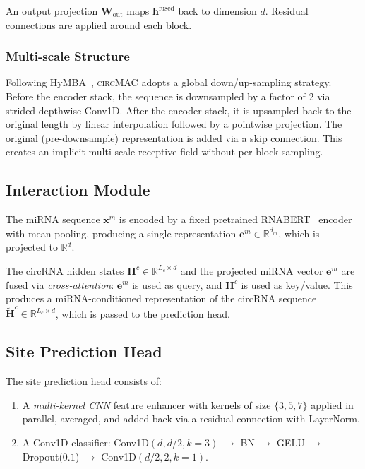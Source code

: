\documentclass[11pt]{article}
\newcommand{\model}{\textsc{circMAC}}
\begin{document}
\noindent
An output projection $\mathbf{W}_{\text{out}}$ maps
$\mathbf{h}^{\text{fused}}$ back to dimension $d$.
Residual connections are applied around each block.

\subsubsection{Multi-scale Structure}

Following HyMBA~\cite{hymba}, \model{} adopts a global down/up-sampling
strategy.
Before the encoder stack, the sequence is downsampled by a factor of 2
via strided depthwise Conv1D.
After the encoder stack, it is upsampled back to the original length by
linear interpolation followed by a pointwise projection.
The original (pre-downsample) representation is added via a skip connection.
This creates an implicit multi-scale receptive field without per-block
sampling.


\subsection{Interaction Module}
\label{sec:interaction}

The miRNA sequence $\mathbf{x}^m$ is encoded by a fixed pretrained
RNABERT~\cite{rnabert} encoder with mean-pooling, producing a single
representation $\mathbf{e}^m \in \mathbb{R}^{d_m}$,
which is projected to $\mathbb{R}^d$.

The circRNA hidden states $\mathbf{H}^c \in \mathbb{R}^{L_c \times d}$
and the projected miRNA vector $\mathbf{e}^m$ are fused via
\emph{cross-attention}: $\mathbf{e}^m$ is used as query, and
$\mathbf{H}^c$ is used as key/value.
This produces a miRNA-conditioned representation of the circRNA sequence
$\tilde{\mathbf{H}}^c \in \mathbb{R}^{L_c \times d}$,
which is passed to the prediction head.


\subsection{Site Prediction Head}

The site prediction head consists of:
\begin{enumerate}[label=\arabic*.,leftmargin=*]
  \item A \emph{multi-kernel CNN} feature enhancer with kernels of size
        $\{3, 5, 7\}$ applied in parallel, averaged, and added back via a
        residual connection with LayerNorm.
  \item A Conv1D classifier:
        Conv1D$(d, d/2, k{=}3)$ $\to$ BN $\to$ GELU $\to$ Dropout($0.1$)
        $\to$ Conv1D$(d/2, 2, k{=}1)$.
\end{enumerate}
\end{document}
